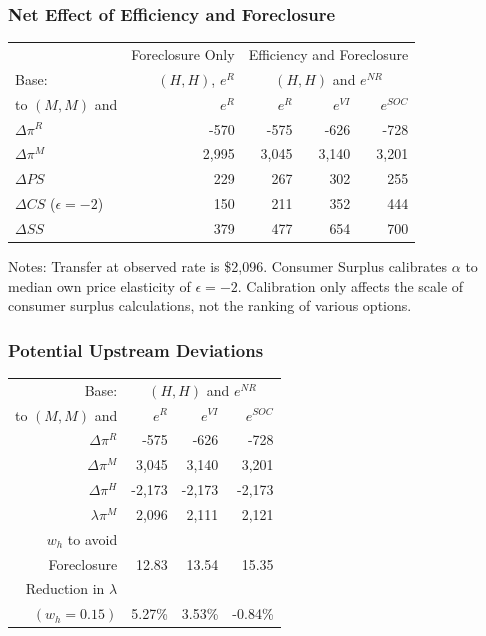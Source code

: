 \begin{frame}[label=neteffect]
\frametitle{Net Effect of Efficiency and Foreclosure}
\begin{table}[htp]
\begin{center}
\begin{tabular}{| l | r | r r r|} 
\hline
&Foreclosure Only&\multicolumn{3}{c|}{Efficiency and Foreclosure}\\
Base:  &$(H,H)$, $e^{R}$& \multicolumn{3}{c|}{ $(H,H)$ and $e^{NR}$} \\ 
to  $(M,M)$ and &$e^R$& $e^{R}$ & $e^{VI}$ & $e^{SOC}$ \\ \hline
$\Delta \pi^R$  & -570& -575 & -626 & -728 \\
$\Delta \pi^M$  & 2,995 & 3,045 & 3,140 & 3,201 \\
$\Delta PS$  & 229 & 267 & 302 & 255 \\
$\Delta CS$ ($\epsilon=-2$) & 150 & 211 & 352 & 444 \\
$\Delta SS$  & 379 & 477 & 654 & 700 \\ \hline
\end{tabular}
\end{center}
\footnotesize
\label{tab:both}
\end{table}
Notes: Transfer at observed rate is \$2,096. Consumer Surplus calibrates $\alpha$ to median own price elasticity of $\epsilon=-2$. Calibration only affects the scale of consumer surplus calculations, not the ranking of various options. 
\hyperlink{more}{}
\end{frame}

\begin{frame}[label=deviations]
\frametitle{Potential Upstream Deviations}
\footnotesize
\begin{table}[htp]
\begin{center}
\begin{tabular}{| r | r r r|} 
\hline
\multicolumn{1}{|r|}{Base: } & \multicolumn{3}{c|}{ $(H,H)$ and $e^{NR}$} \\ 
\multicolumn{1}{|r|}{to  $(M,M)$ and} & $e^{R}$ & $e^{VI}$ & $e^{SOC}$ \\ \hline
$\Delta \pi^R$ & -575 & -626 & -728 \\
$\Delta \pi^M$ & 3,045 & 3,140 & 3,201 \\
$\Delta \pi^H$ & -2,173 & -2,173 & -2,173 \\
$\lambda \pi^M$ & 2,096 & 2,111 & 2,121 \\ \hline
$w_h$ to avoid &&&\\
Foreclosure  & 12.83 & 13.54 & 15.35 \\
Reduction in $\lambda$ &&&\\
$(w_h=0.15)$  & 5.27\% & 3.53\% & -0.84\% \\ \hline
\end{tabular}
\end{center}
\label{tab:discount}
\end{table}
\hyperlink{moredeviations}{}
\end{frame}

